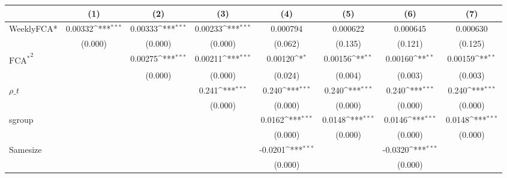 {
\def\sym#1{\ifmmode^{#1}\else\(^{#1}\)\fi}
\begin{tabular}{l*{7}{c}}
\hline\hline
                    &\multicolumn{1}{c}{(1)}         &\multicolumn{1}{c}{(2)}         &\multicolumn{1}{c}{(3)}         &\multicolumn{1}{c}{(4)}         &\multicolumn{1}{c}{(5)}         &\multicolumn{1}{c}{(6)}         &\multicolumn{1}{c}{(7)}         \\
\hline
WeeklyFCA*          &     0.00332\sym{***}&     0.00333\sym{***}&     0.00233\sym{***}&    0.000794         &    0.000622         &    0.000645         &    0.000630         \\
                    &     (0.000)         &     (0.000)         &     (0.000)         &     (0.062)         &     (0.135)         &     (0.121)         &     (0.125)         \\
[1em]
 $ { \text{FCA} ^ * } ^2 $&                     &     0.00275\sym{***}&     0.00211\sym{***}&     0.00120\sym{*}  &     0.00156\sym{**} &     0.00160\sym{**} &     0.00159\sym{**} \\
                    &                     &     (0.000)         &     (0.000)         &     (0.024)         &     (0.004)         &     (0.003)         &     (0.003)         \\
[1em]
$ \rho\_t $          &                     &                     &       0.241\sym{***}&       0.240\sym{***}&       0.240\sym{***}&       0.240\sym{***}&       0.240\sym{***}\\
                    &                     &                     &     (0.000)         &     (0.000)         &     (0.000)         &     (0.000)         &     (0.000)         \\
[1em]
sgroup              &                     &                     &                     &      0.0162\sym{***}&      0.0148\sym{***}&      0.0146\sym{***}&      0.0148\sym{***}\\
                    &                     &                     &                     &     (0.000)         &     (0.000)         &     (0.000)         &     (0.000)         \\
[1em]
Samesize            &                     &                     &                     &     -0.0201\sym{***}&                     &     -0.0320\sym{***}&                     \\
                    &                     &                     &                     &     (0.000)         &                     &     (0.000)         &                     \\

\end{tabular}}

